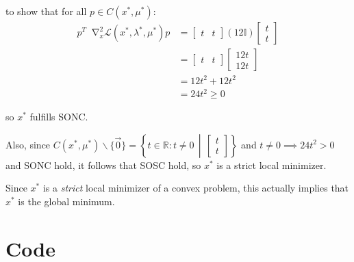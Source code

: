 \documentclass[oneside, a4paper]{book}
\newcommand*\Laplace{\mathop{}\!\mathbin\nabla^2}
\newcommand\br[1]{\left(#1\right)}
\begin{document}
to show that for all $p\in C(x^*, \mu^*)$:
\begin{align}
    p^T\Laplace_x \mathcal{L}(x^*,\lambda^*,\mu^*) p
    &=  \begin{bmatrix}t & t\end{bmatrix} \br{12\mathds{I}} \begin{bmatrix}t \\ t\end{bmatrix}\\
     &=  \begin{bmatrix}t & t\end{bmatrix} \begin{bmatrix}12t \\ 12t\end{bmatrix}\\
     &= 12t^2 + 12t^2 \\
     &= 24t^2 \geq 0
\end{align}

so $x^*$ fulfills  SONC. 


Also, since $C(x^*, \mu^*)\backslash\{\vec{0}\} = \left\{ t\in\mathds{R}: t\neq 0 \,\middle | \, \begin{bmatrix}
t\\t
\end{bmatrix}\right\}$ and $t\neq 0 \implies 24t^2 > 0$ and SONC hold, it follows that SOSC hold, so $x^*$ is a strict local minimizer. 

Since $x^*$ is a \textit{strict} local minimizer of a convex problem, this actually implies that $x^*$ is the global minimum.

\chapter{Code}\label{sec:code}

\inputminted{python}{hanging_chain_ip.py}
\end{document}
